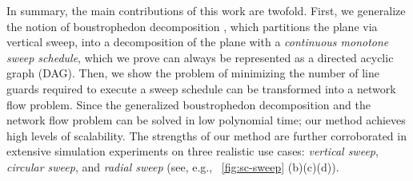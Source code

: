 In summary, the main contributions of this work are twofold. First, we generalize the 
notion of boustrophedon decomposition \cite{choset2000coverage}, which partitions the 
plane via vertical sweep, into a decomposition of the plane with a \emph{continuous 
monotone sweep schedule}, which we prove can always be represented as a directed 
acyclic graph (DAG). 
%
Then, we show the problem of minimizing the number of line guards required to execute a sweep schedule can be transformed into a network flow problem.
%
Since the generalized boustrophedon decomposition and the network flow problem can 
be solved in low polynomial time; our method achieves high levels of scalability.
%
The strengths of our method are further corroborated in extensive simulation experiments 
on three realistic use cases: \emph{vertical sweep}, \emph{circular sweep}, and 
\emph{radial sweep} (see, e.g., ~\ref{fig:sc-sweep} (b)(c)(d)).





\noindent
%


